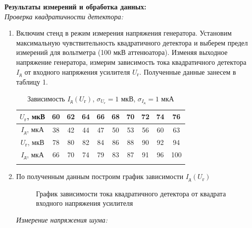 \documentclass[a4paper, 12pt]{article}%
\begin{document}
	\newpage
	\textbf{Результаты измерений и обработка данных: }\\
	
	\textit{Проверка квадратичности детектора: }
	\begin{enumerate}
		
	\item Включим стенд в режим измерения напряжения генератора. Установим максимальную чувствительность квадратичного детектора и выберем предел измерений для вольтметра (100 мкВ аттенюатора). Изменяя выходное напряжение генератора, измерим зависимость тока квадратичного детектора $I_{\text{д}}$ от входного напряжения усилителя $U_{\text{г}}$. Полученные данные занесем в таблицу 1.
	
	\begin{longtable} {|c|c|c|c|c|c|c|c|c|c|}
		\hline
		$U_{\text{г}}$, мкВ & 60 & 62 & 64 & 66 & 68 & 70 & 72 & 74 & 76     \\ \hline
		$I_{\text{д}}$, мкА& 38 & 42 & 44 & 47 & 50 & 53 & 56 & 60 & 63\\ \hline
		\hline
		$U_{\text{г}}$, мкВ & 78 & 80 & 82 & 84 & 86 & 88 & 90 & 92 & 94\\ \hline
		$I_{\text{д}}$, мкА& 66 & 70 & 74 & 79 & 83 & 87 & 91 & 96 & 100\\ \hline
		\caption{Зависимость $I_{\text{д}}(U_{\text{г}})$, $\sigma_{U_{\text{г}}} = 1$ мкВ, $\sigma_{I_{\text{д}}} = 1$ мкА}
	\end{longtable}
	
	\item По полученным данным построим  график зависимости $I_{\text{д}}(U_{\text{г}})$
	\begin{figure}[H]
		\caption{График зависимости тока квадратичного детектора от квадрата входного напряжения усилителя}
	\end{figure}
	\newpage
	\textit{Измерение напряжения шума: }
	 

\end{enumerate}
\end{document}
